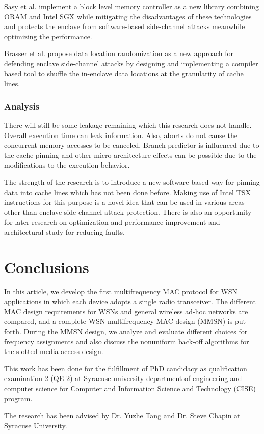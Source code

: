 Sasy et al. \cite{zerotrace} implement a block level memory controller as a new library combining ORAM \cite{oram1,oram2,oram3} and Intel SGX while mitigating the disadvantages of these technologies and protects the enclave from software-based side-channel attacks meanwhile optimizing the performance.

Brasser et al. \cite{drsgx} propose data location randomization as a new approach for defending enclave side-channel attacks by designing and implementing a compiler based tool to shuffle the in-enclave data locations at the granularity of cache lines.

\subsubsection{Analysis}
There will still be some leakage remaining which this research does not handle. Overall execution time can leak information. Also, aborts do not cause the concurrent memory accesses to be canceled. Branch predictor is influenced due to the cache pinning and other micro-architecture effects can be possible due to the modifications to the execution behavior.

The strength of the research is to introduce a new software-based way for pinning data into cache lines which has not been done before. Making use of Intel TSX instructions for this purpose is a novel idea that can be used in various areas other than enclave side channel attack protection. There is also an opportunity for later research on optimization and performance improvement and architectural study for reducing faults.





\section{Conclusions}

In this article, we develop the first multifrequency MAC protocol for
WSN applications in which each device adopts a
single radio transceiver. The different MAC design requirements for
WSNs and general wireless ad-hoc networks are
compared, and a complete WSN multifrequency MAC design (MMSN) is
put forth. During the MMSN design, we analyze and evaluate different
choices for frequency assignments and also discuss the nonuniform
back-off algorithms for the slotted media access design.

\begin{acks}

This work has been done for the fulfillment of PhD candidacy as qualification examination 2 (QE-2) at Syracuse university department of engineering and computer science for Computer and Information Science and Technology (CISE) program.

The research has been advised by Dr. Yuzhe Tang and Dr. Steve Chapin at Syracuse University.

\end{acks}



